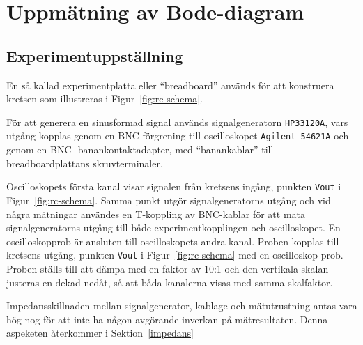 %
%

\section{Uppmätning av Bode-diagram}\label{bode}

\subsection{Experimentuppställning}\label{}
En så kallad experimentplatta eller ``breadboard'' används för att konstruera
kretsen som illustreras i Figur~\ref{fig:rc-schema}.  \par För att generera en
sinusformad signal används signalgeneratorn \texttt{HP33120A}, vars utgång
kopplas genom en BNC-förgrening till oscilloskopet \texttt{Agilent 54621A} och
genom en BNC- banankontaktadapter, med ``banankablar'' till breadboardplattans
skruvterminaler.  \par Oscilloskopets första kanal visar signalen från kretsens
ingång, punkten \texttt{Vout} i Figur~\ref{fig:rc-schema}. Samma punkt utgör
signalgeneratorns utgång och vid några mätningar användes en T-koppling av
BNC-kablar för att mata signalgeneratorns utgång till både experimentkopplingen
och oscilloskopet.  En oscilloskopprob är ansluten till oscilloskopets andra
kanal. Proben kopplas till kretsens utgång, punkten \texttt{Vout} i
Figur~\ref{fig:rc-schema} med en oscilloskop-prob. Proben ställs till att dämpa
med en faktor av 10:1 och den vertikala skalan justeras en dekad nedåt, så att
båda kanalerna visas med samma skalfaktor.
\par Impedansskillnaden mellan signalgenerator, kablage och mätutrustning antas
vara hög nog för att inte ha någon avgörande inverkan på mätresultaten. Denna
aspeketen återkommer i Sektion~\ref{impedans}


